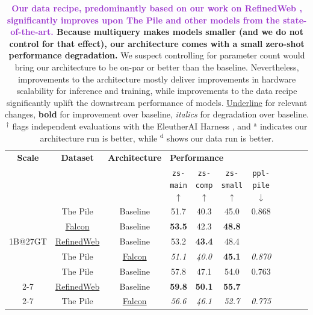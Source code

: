\documentclass{article}
\DeclareRobustCommand{\data}[1]{\textcolor{DarkOrchid}{#1}}
\DeclareRobustCommand{\hardware}[1]{\textcolor{Mahogany}{#1}}
\begin{document}
\begin{table}[h!]
\centering
\caption{\textbf{\data{Our data recipe, predominantly based on our work on RefinedWeb \citep{refinedweb}, significantly improves upon The Pile and other models from the state-of-the-art.} \hardware{Because multiquery makes models smaller (and we do not control for that effect), our architecture comes with a small zero-shot performance degradation.}} We suspect controlling for parameter count would bring our architecture to be on-par or better than the baseline. Nevertheless, improvements to the architecture mostly deliver improvements in hardware scalability for inference and training, while improvements to the data recipe significantly uplift the downstream performance of models. \underline{Underline} for relevant changes, \textbf{bold} for improvement over baseline, \emph{italics} for degradation over baseline. $^\dagger$ flags independent evaluations with the EleutherAI Harness \citep{eval-harness}, and $^\text{a}$ indicates our architecture run is better, while $^\text{d}$ shows our data run is better.}
\label{tab:abl_validation}
\vspace{0.1in}
\centering
\begin{small}
\begin{tabular}{ccccccccccc}
\toprule
\textbf{Scale} & \textbf{Dataset} & \textbf{Architecture} & \multicolumn{4}{l}{\textbf{Performance}} \\
& & & \texttt{zs-main} $\uparrow$ & \texttt{zs-comp} $\uparrow$ & \texttt{zs-small} $\uparrow$ & \texttt{ppl-pile} $\downarrow$\\
\midrule
\multirow{5}{*}{1B@27GT} & The Pile & Baseline & 51.7 & 40.3 & 45.0 & 0.868 \\ \cmidrule{2-7} 
 & \underline{Falcon} & Baseline  & \textbf{53.5} & 42.3  & \textbf{48.8} &  \\
 & \underline{RefinedWeb} & Baseline & 53.2 & \textbf{43.4} & 48.4 &  \\ \cmidrule{2-7}
 & The Pile & \underline{Falcon} & \textit{51.1} & \textit{40.0} & \textbf{45.1} & \textit{0.870} \\ \midrule \midrule
 \multirow{4}{*}{1B@350GT} & The Pile & Baseline & 57.8 & 47.1 & 54.0 & 0.763 \\ \cmidrule{2-7} 
  & \underline{RefinedWeb} & Baseline & \textbf{59.8} & \textbf{50.1} & \textbf{55.7} & \\ \cmidrule{2-7} 
   & The Pile & \underline{Falcon} & \textit{56.6} & \textit{46.1} & \textit{52.7} & \textit{0.775} \\ \midrule

\end{tabular}
\end{small}
\end{table}
\end{document}
